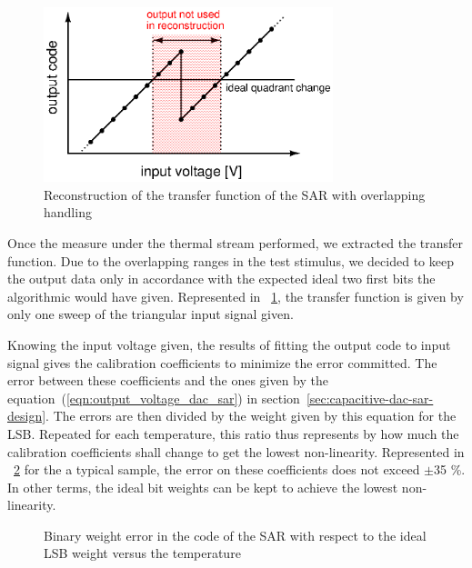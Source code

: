 \begin{figure}[htp]
    \centering
    \includegraphics[width=0.75\textwidth]{Chapter5/Figs/sar_test/sar-tf-overlapp.ps}
    \caption{Reconstruction of the transfer function of the SAR with overlapping handling}
    \label{fig:sar-tf-overlap}
\end{figure}

Once the measure under the thermal stream performed, we extracted the transfer function. Due to the overlapping ranges in the test stimulus, we decided to keep the output data only in accordance with the expected ideal two first bits the algorithmic would have given. Represented in \figurename~\ref{fig:sar-tf-overlap}, the transfer function is given by only one sweep of the triangular input signal given.

Knowing the input voltage given, the results of fitting the output code to input signal gives the calibration coefficients to minimize the error committed. The error between these coefficients and the ones given by the equation~(\ref{eqn:output_voltage_dac_sar}) in section~\ref{sec:capacitive-dac-sar-design}. The errors are then divided by the weight given by this equation for the LSB\@.
Repeated for each temperature, this ratio thus represents by how much the calibration coefficients shall change to get the lowest non-linearity. Represented in \figurename~\ref{fig:sar-test-coef_doe05_11} for the a typical sample, the error on these coefficients does not exceed $\pm$35 \%. In other terms, the ideal bit weights can be kept to achieve the lowest non-linearity.

\begin{figure}[htp]
    \centering
    
    \caption{Binary weight error in the code of the SAR with respect to the ideal LSB weight versus the temperature}
    \label{fig:sar-test-coef_doe05_11}
\end{figure}

